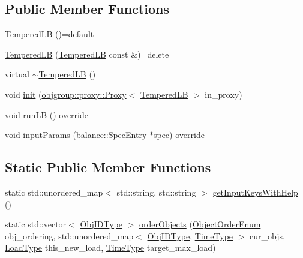 \subsection*{Public Member Functions}
\begin{DoxyCompactItemize}
\item 
\hyperlink{structvt_1_1vrt_1_1collection_1_1lb_1_1_tempered_l_b_aa891f50b88bc2c43675205fe42f1a1bc}{Tempered\+LB} ()=default
\item 
\hyperlink{structvt_1_1vrt_1_1collection_1_1lb_1_1_tempered_l_b_a95a26dba017d5d4abbdd2e93cb3c32bd}{Tempered\+LB} (\hyperlink{structvt_1_1vrt_1_1collection_1_1lb_1_1_tempered_l_b}{Tempered\+LB} const \&)=delete
\item 
virtual \hyperlink{structvt_1_1vrt_1_1collection_1_1lb_1_1_tempered_l_b_ad8138112521d369244bd38a327c41832}{$\sim$\+Tempered\+LB} ()
\item 
void \hyperlink{structvt_1_1vrt_1_1collection_1_1lb_1_1_tempered_l_b_a57685d91f6518f5e479aba83f779d0f5}{init} (\hyperlink{structvt_1_1objgroup_1_1proxy_1_1_proxy}{objgroup\+::proxy\+::\+Proxy}$<$ \hyperlink{structvt_1_1vrt_1_1collection_1_1lb_1_1_tempered_l_b}{Tempered\+LB} $>$ in\+\_\+proxy)
\item 
void \hyperlink{structvt_1_1vrt_1_1collection_1_1lb_1_1_tempered_l_b_ae4013cac53ec29c0864d6971b4936428}{run\+LB} () override
\item 
void \hyperlink{structvt_1_1vrt_1_1collection_1_1lb_1_1_tempered_l_b_a12430d0bfd997324ac4343d736d0572e}{input\+Params} (\hyperlink{structvt_1_1vrt_1_1collection_1_1balance_1_1_spec_entry}{balance\+::\+Spec\+Entry} $\ast$spec) override
\end{DoxyCompactItemize}
\subsection*{Static Public Member Functions}
\begin{DoxyCompactItemize}
\item 
static std\+::unordered\+\_\+map$<$ std\+::string, std\+::string $>$ \hyperlink{structvt_1_1vrt_1_1collection_1_1lb_1_1_tempered_l_b_a37e3599168c2a90967bd7dc7128c54f0}{get\+Input\+Keys\+With\+Help} ()
\item 
static std\+::vector$<$ \hyperlink{structvt_1_1vrt_1_1collection_1_1lb_1_1_base_l_b_a790b22acf448880599724749cdc4e9b3}{Obj\+I\+D\+Type} $>$ \hyperlink{structvt_1_1vrt_1_1collection_1_1lb_1_1_tempered_l_b_a3cb11a0007b4402dc803a9d2d9d23cd9}{order\+Objects} (\hyperlink{namespacevt_1_1vrt_1_1collection_1_1lb_a3c71e131f84e2ccbb95f43a1058c749c}{Object\+Order\+Enum} obj\+\_\+ordering, std\+::unordered\+\_\+map$<$ \hyperlink{structvt_1_1vrt_1_1collection_1_1lb_1_1_base_l_b_a790b22acf448880599724749cdc4e9b3}{Obj\+I\+D\+Type}, \hyperlink{namespacevt_a876a9d0cd5a952859c72de8a46881442}{Time\+Type} $>$ cur\+\_\+objs, \hyperlink{structvt_1_1vrt_1_1collection_1_1lb_1_1_base_l_b_a215e22b9f12678303f49615ae3be05cc}{Load\+Type} this\+\_\+new\+\_\+load, \hyperlink{namespacevt_a876a9d0cd5a952859c72de8a46881442}{Time\+Type} target\+\_\+max\+\_\+load)
\end{DoxyCompactItemize}
